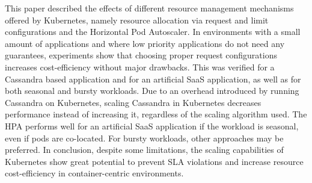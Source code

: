 This paper described the effects of different resource management mechanisms offered by Kubernetes, namely resource allocation via request and limit configurations and the Horizontal Pod Autoscaler. In environments with a small amount of applications and where low priority applications do not need any guarantees, experiments show that choosing proper request configurations increases cost-efficiency without major drawbacks. This was verified for a Cassandra based application and for an artificial SaaS application, as well as for both seasonal and bursty workloads. Due to an overhead introduced by running Cassandra on Kubernetes, scaling Cassandra in Kubernetes decreases performance instead of increasing it, regardless of the scaling algorithm used. The HPA performs well for an artificial SaaS application if the workload is seasonal, even if pods are co-located. For bursty workloads, other approaches may be preferred. In conclusion, despite some limitations, the scaling capabilities of Kubernetes show great potential to prevent SLA violations and increase resource cost-efficiency in container-centric environments.




